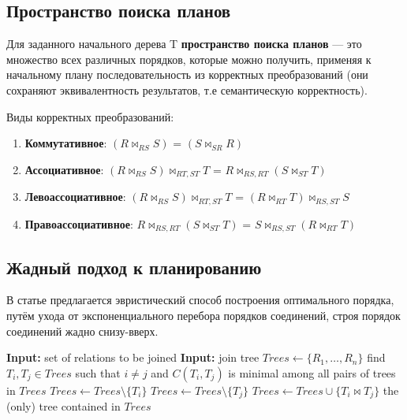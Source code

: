 \subsection{Пространство поиска планов}


Для заданного начального  дерева T  \textbf{пространство поиска планов} \cite{CorrEnum} — это множество всех различных порядков, которые можно получить, 
применяя к начальному плану последовательность из корректных преобразований (они сохраняют эквивалентность результатов, т.е семантическую корректность). 
\par

Виды корректных преобразований:
\begin{enumerate}
    \item \textbf{Коммутативное}: $(R \Join_{RS} S)$ = $(S \Join_{SR} R)$
    \item \textbf{Ассоциативное}: $(R \Join_{RS} S) \Join_{RT,ST} T$ = $R \Join_{RS,RT} (S \Join_{ST} T)$
    \item \textbf{Левоассоциативное}: $(R \Join_{RS} S) \Join_{RT,ST} T$ = $(R \Join_{RT} T) \Join_{RS,ST} S$
    \item \textbf{Правоассоциативное}: $R \Join_{RS,RT} (S \Join_{ST} T)$ = $S \Join_{RS,ST} (R \Join_{RT} T)$
\end{enumerate}


\subsection{Жадный подход к планированию}


В статье \cite{Feg} предлагается эвристический способ построения оптимального порядка, 
путём ухода от экспоненциального перебора порядков соединений, строя порядок соединений жадно снизу-вверх.

\begin{algorithm}[H]
\caption{GOO$(\{R_1,\dots,R_n\},\,\textit{C}(T_1,T_2))$}
\begin{algorithmic}[1]
\State \textbf{Input:} set of relations to be joined
\State \textbf{Input:} join tree
\State $\textit{Trees} \gets \{R_1,\dots,R_n\}$
  \State find $T_i,T_j \in \textit{Trees}$ such that $i \neq j$ and
  $\textit{C}(T_i,T_j)$ is minimal among all pairs of trees in $\textit{Trees}$
  \State $\textit{Trees} \gets \textit{Trees}\setminus \{T_i\}$
  \State $\textit{Trees} \gets \textit{Trees}\setminus \{T_j\}$
  \State $\textit{Trees} \gets \textit{Trees}\cup \{T_i \bowtie T_j\}$
\EndWhile
\State \Return the (only) tree contained in $\textit{Trees}$
\end{algorithmic}
\end{algorithm}

